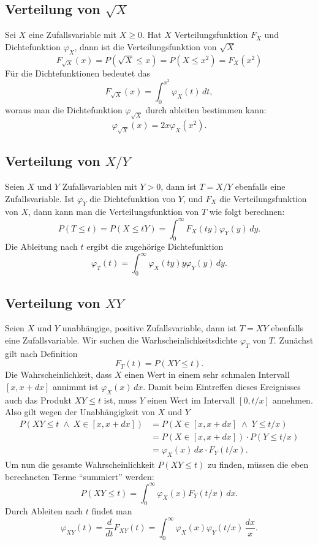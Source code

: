 \subsection{Verteilung von \texorpdfstring{$\sqrt{X}$}{Wurzel X}} \label{verteilungsfunktion-wurzel}
Sei $X$ eine Zufallsvariable mit $X\ge 0$.
Hat $X$ Verteilungsfunktion $F_X$
und Dichtefunktion
$\varphi_X$, dann ist die Verteilungsfunktion von $\sqrt{X}$
\[
F_{\sqrt{X}}(x)=P(\sqrt{X}\le x)=P(X\le x^2)=F_X(x^2)
\]
Für die Dichtefunktionen bedeutet das
\[
F_{\sqrt{X}}(x)=\int_0^{x^2}\varphi_X(t)\,dt,
\]
woraus man die Dichtefunktion $\varphi_{\sqrt{X}}$ durch ableiten
bestimmen kann:
\[
\varphi_{\sqrt{X}}(x)=2x\varphi_X(x^2).
\]

\subsection{Verteilung von \texorpdfstring{$X/Y$}{X/Y}} \label{verteilungsfunktion-quotient}
Seien $X$ und $Y$ Zufallsvariablen mit $Y>0$, dann ist $T=X/Y$ ebenfalls
eine Zufallsvariable.
Ist $\varphi_Y$ die Dichtefunktion von $Y$,
und $F_X$ die Verteilungsfunktion von $X$, dann kann man die
Verteilungsfunktion von $T$ wie folgt berechnen:
\[
P(T\le t)=P(X\le tY)=\int_0^\infty F_X(ty)\varphi_Y(y)\,dy.
\]
Die Ableitung nach $t$ ergibt die zugehörige Dichtefunktion
\[
\varphi_T(t)=\int_0^\infty\varphi_X(ty)y\varphi_Y(y)\,dy.
\]

\subsection{Verteilung von \texorpdfstring{$XY$}{XY}} \label{verteilungsfunktion-produkt}
Seien $X$ und $Y$ unabhängige, positive Zufallsvariable, dann ist $T=XY$
ebenfalls eine Zufallsvariable.
Wir suchen die Warhscheinlichkeitsdichte $\varphi_T$ von $T$.
Zunächst gilt nach Definition
\[
F_T(t)=P(XY\le t).
\]
Die Wahrscheinlichkeit, dass $X$ einen Wert in einem sehr schmalen Intervall
$[x,x+dx]$ annimmt ist $\varphi_X(x)\,dx$.
Damit beim Eintreffen dieses Ereignisses auch das Produkt
$XY\le t$ ist, muss $Y$ einen Wert im Intervall $[0,t/x]$ annehmen.
Also gilt wegen der Unabhängigkeit von $X$ und $Y$
\begin{align*}
P(XY\le t\;\wedge\; X\in[x,x+dx])&=P(X\in[x,x+dx]\;\wedge\; Y\le t/x)\\
&=P(X\in[x,x+dx])\cdot P(Y\le t/x)\\
&=\varphi_X(x)\,dx\cdot F_Y(t/x).
\end{align*}
Um nun die gesamte Wahrscheinlichkeit $P(XY\le t)$ zu finden, müssen die eben
berechneten Terme ``summiert'' werden:
\[
P(XY\le t)=\int_0^\infty\varphi_X(x)F_Y(t/x)\,dx.
\]
Durch Ableiten nach $t$ findet man
\[
\varphi_{XY}(t)=\frac{d}{dt}F_{XY}(t)=\int_0^\infty \varphi_X(x)\varphi_Y(t/x)\,\frac{dx}x.
\]



